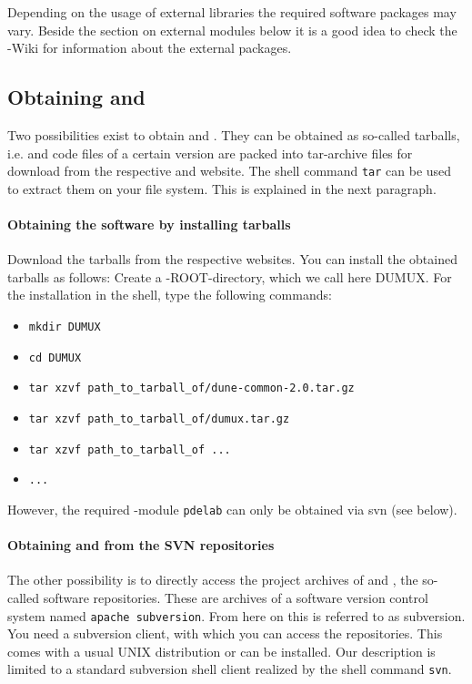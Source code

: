 Depending on the usage of external libraries the required software packages may vary. 
Beside the section on external modules below it is a good idea to check the {\Dune}-Wiki \cite{DUNE-HP} for information about the external packages.

\subsection{Obtaining \Dune and \Dumux}
Two possibilities exist to obtain \Dune and \Dumux. 
They can be obtained as so-called tarballs, i.e. \Dumux and \Dune code files of a certain version are packed into tar-archive files for download from the respective {\Dune} and {\Dumux} website. 
The shell command \texttt{tar} can be used to extract them on your file system. This is explained in the next paragraph. 

\paragraph{Obtaining the software by installing tarballs}
Download the tarballs from the respective websites. You can install the obtained tarballs as follows: Create a {\Dune}-ROOT-directory, which we call here DUMUX. 
For the installation in the shell, type the following commands: 
\begin{itemize}
\item \texttt{mkdir DUMUX}
\item \texttt{cd DUMUX}
\item \texttt{tar xzvf path\_to\_tarball\_of/dune-common-2.0.tar.gz }
\item \texttt{tar xzvf path\_to\_tarball\_of/dumux.tar.gz}
\item \texttt{tar xzvf path\_to\_tarball\_of ...}
\item \texttt{...}
\end{itemize} 
However, the required \Dune-module \verb+pdelab+  can only be obtained via svn (see below).

\paragraph{Obtaining \Dune and \Dumux from the SVN repositories} 
The other possibility is to directly access the project archives of \Dune and \Dumux, the so-called software repositories. 
These are archives of a software version control system named \texttt{apache subversion}. 
From here on this is referred to as subversion.
You need a subversion client, with which you can access the repositories. 
This comes with a usual UNIX distribution or can be installed. Our description is limited to a standard subversion shell client realized by the shell command \texttt{svn}.

